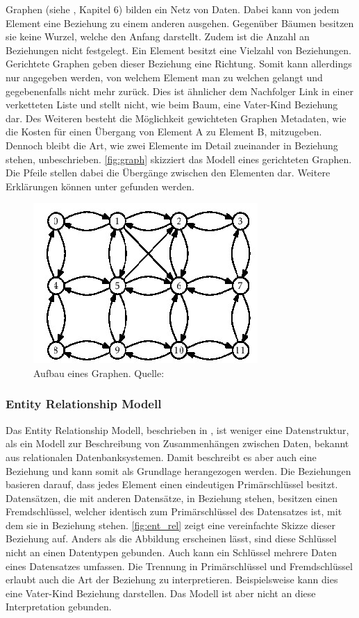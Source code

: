 \documentclass[a4paper]{article}
\begin{document}
	Graphen (siehe \cite{FundData}, Kapitel 6) bilden ein Netz von Daten. Dabei
	kann von jedem Element eine Beziehung zu einem anderen ausgehen. Gegenüber
	Bäumen besitzen sie keine Wurzel, welche den Anfang darstellt. Zudem ist die
	Anzahl an Beziehungen nicht festgelegt. Ein Element besitzt eine Vielzahl von
	Beziehungen. Gerichtete Graphen geben dieser Beziehung eine Richtung.
	Somit kann allerdings nur angegeben werden, von welchem Element man zu welchen
	gelangt und gegebenenfalls nicht mehr zurück. Dies ist ähnlicher dem 
	Nachfolger Link in einer verketteten Liste und stellt nicht,
	wie beim Baum, eine Vater-Kind Beziehung dar. Des Weiteren besteht die
	Möglichkeit gewichteten Graphen Metadaten, wie die Kosten für einen
	Übergang von Element A zu Element B, mitzugeben. Dennoch bleibt
	die Art, wie zwei Elemente im Detail zueinander in Beziehung stehen,	
	unbeschrieben. \autoref{fig:graph} skizziert das Modell eines gerichteten
	Graphen. Die Pfeile stellen dabei die Übergänge zwischen den Elementen dar.
	Weitere Erklärungen können unter \cite{Graph} gefunden werden. 

	\begin{figure}[H] 
		\centerline{
			\includegraphics[scale=0.8]{../Bilder/graph.jpg}
		}
		\caption{Aufbau eines Graphen. Quelle: \cite{Graph}}
		\label{fig:graph}
	\end{figure}
	
	\subsubsection{Entity Relationship Modell}
	
	Das Entity Relationship Modell, beschrieben in \cite{EntRel}, ist weniger
	eine Datenstruktur, als ein Modell zur Beschreibung von Zusammenhängen zwischen
	Daten, bekannt aus relationalen Datenbanksystemen. Damit beschreibt es aber
	auch eine Beziehung und kann somit als Grundlage herangezogen werden. Die
	Beziehungen basieren darauf, dass jedes Element einen eindeutigen 
	Primärschlüssel besitzt. Datensätzen, die mit anderen Datensätze, in Beziehung 
	stehen, besitzen einen Fremdschlüssel, welcher identisch zum Primärschlüssel
	des Datensatzes ist, mit dem sie in Beziehung stehen. \autoref{fig:ent_rel}
	zeigt eine vereinfachte Skizze dieser Beziehung auf. Anders als die Abbildung
	erscheinen lässt, sind diese Schlüssel nicht an einen Datentypen gebunden. Auch
	kann ein Schlüssel mehrere Daten eines Datensatzes umfassen. Die Trennung
	in Primärschlüssel und Fremdschlüssel erlaubt auch die Art der Beziehung zu
	interpretieren. Beispielsweise kann dies eine Vater-Kind Beziehung darstellen.
	Das Modell ist aber nicht an diese Interpretation gebunden.
	
\end{document}
